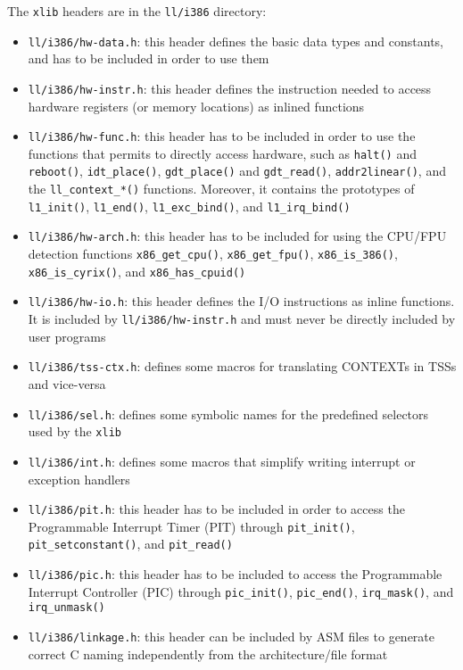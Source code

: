\documentclass[a4paper]{report}
\begin{document}
The {\tt xlib} headers are in the {\tt ll/i386} directory:
\begin{itemize}
	\item {\tt ll/i386/hw-data.h}: this header defines the basic data
		types and constants, and has to be included in order to use
		them
	\item {\tt ll/i386/hw-instr.h}: this header defines the instruction
		needed to access hardware registers (or memory locations) as
		inlined functions
	\item {\tt ll/i386/hw-func.h}: this header has to be included in
		order to use the functions that permits to directly access
		hardware, such as {\tt halt()} and {\tt reboot()},
		{\tt idt\_place()}, {\tt gdt\_place()}  and
		{\tt gdt\_read()}, {\tt addr2linear()}, and the
		{\tt ll\_context\_*()} functions. Moreover, it contains the
		prototypes of {\tt l1\_init()}, {\tt l1\_end()},
		{\tt l1\_exc\_bind()}, and {\tt l1\_irq\_bind()}
	\item {\tt ll/i386/hw-arch.h}: this header has to be included for
		using the CPU/FPU detection functions {\tt x86\_get\_cpu()},
		{\tt  x86\_get\_fpu()}, {\tt  x86\_is\_386()},
		{\tt x86\_is\_cyrix()}, and {\tt x86\_has\_cpuid()}
	\item {\tt ll/i386/hw-io.h}: this header defines the I/O
		instructions as inline functions. It is included by
		{\tt ll/i386/hw-instr.h} and must never be directly
		included by user programs
	\item {\tt ll/i386/tss-ctx.h}: defines some macros for translating
		CONTEXTs in TSSs and vice-versa
	\item {\tt ll/i386/sel.h}: defines some symbolic names for the
		predefined selectors used by the {\tt xlib}
	\item {\tt ll/i386/int.h}: defines some macros that simplify
		writing interrupt or exception handlers
	\item {\tt ll/i386/pit.h}: this header has to be included in order
		to access the Programmable Interrupt Timer (PIT) through
		{\tt pit\_init()}, {\tt pit\_setconstant()}, and
		{\tt pit\_read()}
	\item {\tt ll/i386/pic.h}: this header has to be included to
		access the Programmable Interrupt Controller (PIC)
		through {\tt  pic\_init()}, {\tt pic\_end()},
		{\tt irq\_mask()}, and {\tt irq\_unmask()}
	\item {\tt ll/i386/linkage.h}: this header can be included by
		ASM files to generate correct C naming independently from
		the architecture/file format

\end{itemize}
\end{document}
